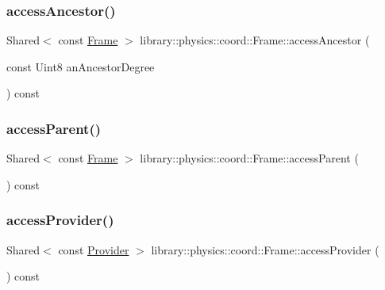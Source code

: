 \subsubsection{\texorpdfstring{access\+Ancestor()}{accessAncestor()}}
{\footnotesize\ttfamily Shared$<$ const \hyperlink{classlibrary_1_1physics_1_1coord_1_1_frame}{Frame} $>$ library\+::physics\+::coord\+::\+Frame\+::access\+Ancestor (\begin{DoxyParamCaption}\item[{const Uint8}]{an\+Ancestor\+Degree }\end{DoxyParamCaption}) const}

\mbox{\label{classlibrary_1_1physics_1_1coord_1_1_frame_a30d789571e08b1fbcddbdde656a95a79}} 
\subsubsection{\texorpdfstring{access\+Parent()}{accessParent()}}
{\footnotesize\ttfamily Shared$<$ const \hyperlink{classlibrary_1_1physics_1_1coord_1_1_frame}{Frame} $>$ library\+::physics\+::coord\+::\+Frame\+::access\+Parent (\begin{DoxyParamCaption}{ }\end{DoxyParamCaption}) const}

\mbox{\label{classlibrary_1_1physics_1_1coord_1_1_frame_a5da9096ace352a91d272677cc159c059}} 
\subsubsection{\texorpdfstring{access\+Provider()}{accessProvider()}}
{\footnotesize\ttfamily Shared$<$ const \hyperlink{classlibrary_1_1physics_1_1coord_1_1frame_1_1_provider}{Provider} $>$ library\+::physics\+::coord\+::\+Frame\+::access\+Provider (\begin{DoxyParamCaption}{ }\end{DoxyParamCaption}) const}

